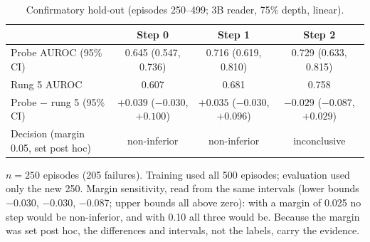 \begin{table}[htbp]
\centering\small
\caption{Confirmatory hold-out (episodes 250--499; 3B reader, 75\% depth, linear).}\label{tab:confirm}
\begin{tabularx}{\linewidth}{@{}Lccc@{}}
\toprule
 & Step 0 & Step 1 & Step 2 \\
\midrule
Probe AUROC (95\% CI) & 0.645 (0.547, 0.736) & 0.716 (0.619, 0.810) & 0.729 (0.633, 0.815) \\
Rung 5 AUROC & 0.607 & 0.681 & 0.758 \\
Probe $-$ rung 5 (95\% CI) & $+0.039$ ($-0.030$, $+0.100$) & $+0.035$ ($-0.030$, $+0.096$) & $-0.029$ ($-0.087$, $+0.029$) \\
Decision (margin 0.05, set post hoc) & non-inferior & non-inferior & inconclusive \\
\bottomrule
\end{tabularx}
\par\smallskip\raggedright\footnotesize
$n = 250$ episodes (205 failures). Training used all 500 episodes; evaluation used only the new 250. Margin sensitivity, read from the same intervals (lower bounds $-0.030$, $-0.030$, $-0.087$; upper bounds all above zero): with a margin of 0.025 no step would be non-inferior, and with 0.10 all three would be. Because the margin was set post hoc, the differences and intervals, not the labels, carry the evidence.
\end{table}

